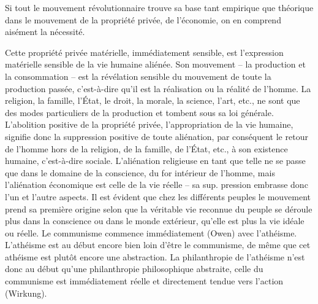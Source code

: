 \documentclass[french,twoside]{book} %
\begin{document}
Si tout le mouvement révolutionnaire trouve sa base tant empirique que théorique dans le mouvement de la propriété privée, de l’économie, on en comprend aisément la nécessité.\par
Cette propriété privée matérielle, immédiatement sensible, est l’expression matérielle sensible de la vie humaine aliénée. Son mouvement – la production et la consommation – est la révélation sensible du mouvement de toute la production passée, c’est-à-dire qu’il est la réalisation ou la réalité de l’homme. La religion, la famille, l’État, le droit, la morale, la science, l’art, etc., ne sont que des modes particuliers de la production et tombent sous sa loi générale. L’abolition positive de la propriété privée, l’appropriation de la vie humaine, signifie donc la suppression positive de toute aliénation, par conséquent le retour de l’homme hors de la religion, de la famille, de l’État, etc., à son existence humaine, c’est-à-dire sociale. L’aliénation religieuse en tant que telle ne se passe que dans le domaine de la conscience, du for intérieur de l’homme, mais l’aliénation économique est celle de la vie réelle – sa sup. pression embrasse donc l’un et l’autre aspects. Il est évident que chez les différents peuples le mouvement prend sa première origine selon que la véritable vie reconnue du peuple se déroule plus dans la conscience ou dans le monde extérieur, qu’elle est plus la vie idéale ou réelle. Le communisme commence immédiatement (Owen) avec l’athéisme. L’athéisme est au début encore bien loin d’être le communisme, de même que cet athéisme est plutôt encore une abstraction. La philanthropie de l’athéisme n’est donc au début qu’une philanthropie philosophique abstraite, celle du communisme est immédiatement réelle et directement tendue vers l’action (Wirkung).\par
\end{document}
